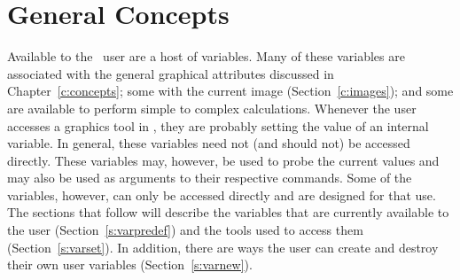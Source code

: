 %
%

\section		{General Concepts}

Available to the \wip\ user are a host of variables.
Many of these variables are associated with the general
graphical attributes discussed in Chapter~\ref{c:concepts};
some with the current image (Section~\ref{c:images});
and some are available to perform simple to complex calculations.
Whenever the user accesses a graphics tool in \wip,
they are probably setting the value of an internal variable.
In general, these variables need not (and should not) be accessed directly.
These variables may, however,
be used to probe the current values and may also
be used as arguments to their respective commands.
Some of the variables, however, can only be accessed
directly and are designed for that use.
The sections that follow will describe the variables that are currently
available to the user (Section~\ref{s:varpredef})
and the tools used to access them (Section~\ref{s:varset}).
In addition, there are ways the user can create and destroy
their own user variables (Section~\ref{s:varnew}).


